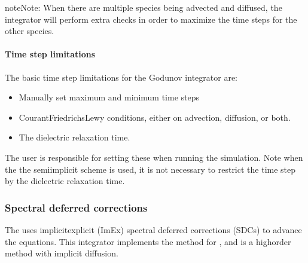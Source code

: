 \documentclass[letterpaper,10pt,english]{sphinxmanual}
\begin{document}
\begin{sphinxadmonition}{note}{Note:}
When there are multiple species being advected and diffused, the integrator will perform extra checks in order to maximize the time steps for the other species.
\end{sphinxadmonition}


\paragraph{Time step limitations}
\label{\detokenize{Applications/CdrPlasmaModel:time-step-limitations}}
The basic time step limitations for the Godunov integrator are:
\begin{itemize}
\item {} 
Manually set maximum and minimum time steps

\item {} 
Courant\sphinxhyphen{}Friedrichs\sphinxhyphen{}Lewy conditions, either on advection, diffusion, or both.

\item {} 
The dielectric relaxation time.

\end{itemize}

The user is responsible for setting these when running the simulation.
Note when the the semi\sphinxhyphen{}implicit scheme is used, it is not necessary to restrict the time step by the dielectric relaxation time.


\subsubsection{Spectral deferred corrections}
\label{\detokenize{Applications/CdrPlasmaModel:spectral-deferred-corrections}}\label{\detokenize{Applications/CdrPlasmaModel:chap-sisdc}}
The  uses implicit\sphinxhyphen{}explicit (ImEx) spectral deferred corrections (SDCs) to advance the equations.
This integrator implements the  method for , and is a high\sphinxhyphen{}order method with implicit diffusion.
\end{document}
